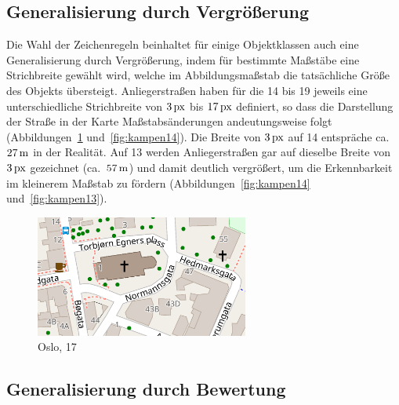 \documentclass[../main/thesis.tex]{subfiles}
\begin{document}



\subsection{Generalisierung durch Vergrößerung}

Die Wahl der Zeichenregeln beinhaltet für einige Objektklassen auch eine Generalisierung durch Vergrößerung, indem für bestimmte Maßstäbe eine Strichbreite gewählt wird, welche im Abbildungsmaßstab die tatsächliche Größe des Objekts übersteigt.
Anliegerstraßen haben für die  14 bis 19 jeweils eine unterschiedliche Strichbreite von $\unit[3]{px}$ bis $\unit[17]{px}$ definiert, so dass die Darstellung der Straße in der Karte Maßstabsänderungen andeutungsweise folgt (Abbildungen~\ref{fig:kampen17} und~\ref{fig:kampen14}). 
Die Breite von $\unit[3]{px}$ auf  14 entspräche ca.~$\unit[27]{m}$ in der Realität. 
Auf  13 werden Anliegerstraßen gar auf dieselbe Breite von $\unit[3]{px}$ gezeichnet (ca.~$\unit[57]{m}$) und damit deutlich vergrößert, um die Erkennbarkeit im kleinerem Maßstab zu fördern (Abbildungen~\ref{fig:kampen14} und~\ref{fig:kampen13}).


\begin{figure}[ht]
    \centering
    \includegraphics[width=7cm]{../chapter2/kampen-z17}
    \caption{Oslo,  17}\label{fig:kampen17}
\end{figure}



\subsection{Generalisierung durch Bewertung}
\end{document}
